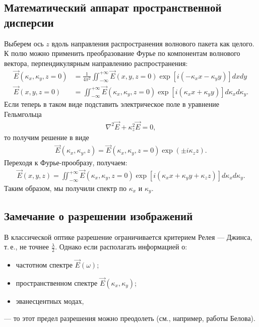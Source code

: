 \subsection{Математический аппарат пространственной дисперсии}
Выберем ось \(z\) вдоль направления распространения волнового пакета как целого.
К полю можно применить преобразование Фурье по компонентам волнового вектора,
перпендикулярным направлению распространения:
\begin{align*}
  \vec{E}(\kappa_x, \kappa_y, z=0) &= \frac{1}{4\pi^2}\iint_{-\infty}^{+\infty}
  \vec{E}(x, y, z=0) \exp\left[i(-\kappa_x x - \kappa_y y)\right] dxdy \\
  \vec{E}(x, y, z=0) &= \iint_{-\infty}^{+\infty} \vec{E}(\kappa_x, \kappa_y, z=0)
  \exp\left[i(\kappa_x x + \kappa_y y)\right] d\kappa_xd\kappa_y. 
\end{align*}
Если теперь в таком виде подставить электрическое поле в уравнение Гельмгольца
\begin{align*}
  \nabla^2\vec{E} + \kappa_z^2\vec{E} = 0,
\end{align*}
то получим решение в виде
\begin{align*}
  \vec{E}(\kappa_x, \kappa_y, z) = \vec{E}(\kappa_x, \kappa_y, z=0)\exp(\pm
  i\kappa_z z).
\end{align*}
Переходя к Фурье-прообразу, получаем:
\begin{align*}
  \vec{E}(x, y, z) = \iint_{-\infty}^{+\infty} \vec{E}(\kappa_x, \kappa_y, z=0)
  \exp\left[i(\kappa_xx + \kappa_yy + \kappa_zz)\right] d\kappa_xd\kappa_y.
\end{align*}
Таким образом, мы получили спектр по \(\kappa_x\) и \(\kappa_y\).

\subsection{Замечание о разрешении изображений}
В классической оптике разрешение ограничивается критерием Релея --- Джинса,
т.\,е., не точнее \(\frac{\lambda}{2}\). Однако если располагать информацией о:
\begin{itemize}
  \item частотном спектре \(\vec{E}(\omega)\);
  \item пространственном спектре \(\vec{E}(\kappa_x, \kappa_y)\);
  \item эванесцентных модах,
\end{itemize}
--- то этот предел разрешения можно преодолеть (см., например, работы Белова).

